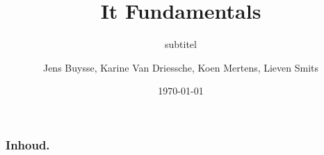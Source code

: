 \documentclass[aspectratio=169]{beamer}
\title[It Fundamentals]{It Fundamentals}
\subtitle{subtitel}
\author{Jens Buysse, Karine Van Driessche, Koen Mertens, Lieven Smits}
\date{\today}
\begin{document}

\frame{\maketitle}

\begin{frame}[allowframebreaks]
  \frametitle{Inhoud.}

  \tableofcontents
\end{frame}
 


	
	
	
	
	
\end{document}
